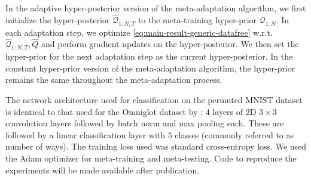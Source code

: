 \documentclass{article} %
\theoremstyle{definition}
\newcommand{\RM}[1]{\textcolor{magenta}{\{RM: #1\}}}
\begin{document}
In the adaptive hyper-posterior version of the meta-adaptation algorithm, we first initialize the hyper-posterior $\hat{\mathcal{Q}}_{1:N, T}$ to the meta-training hyper-prior $\mathcal{Q}_{1:N}$. In each adaptation step, we optimize \eqref{eq:main-result-generic-datafree} w.r.t.\! $\hat{\mathcal{Q}}_{1:N, T},\hat{Q}$ and perform gradient updates on the hyper-posterior. We then set the hyper-prior for the next adaptation step as the current hyper-posterior.
In the constant hyper-prior version of the meta-adaptation algorithm, the hyper-prior remains the same throughout the meta-adaptation process.

The network architecture used for classification on the permuted MNIST dataset is identical to that used for the Omniglot dataset by \citet{Vinyals2016}: $4$ layers of $2$D $3\times 3$ convolution layers followed by batch norm and max pooling each. These are followed by a linear classification layer with $5$ classes (commonly referred to as number of ways). The training loss used was standard cross-entropy loss. We used the Adam optimizer \citep{Kingma2015} for meta-training and meta-testing. 
Code to reproduce the experiments will be made available after publication.
\end{document}
